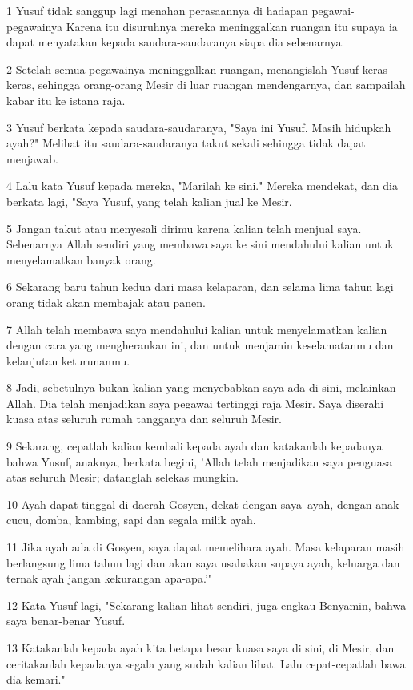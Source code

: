 \par 1 Yusuf tidak sanggup lagi menahan perasaannya di hadapan pegawai-pegawainya Karena itu disuruhnya mereka meninggalkan ruangan itu supaya ia dapat menyatakan kepada saudara-saudaranya siapa dia sebenarnya.
\par 2 Setelah semua pegawainya meninggalkan ruangan, menangislah Yusuf keras-keras, sehingga orang-orang Mesir di luar ruangan mendengarnya, dan sampailah kabar itu ke istana raja.
\par 3 Yusuf berkata kepada saudara-saudaranya, "Saya ini Yusuf. Masih hidupkah ayah?" Melihat itu saudara-saudaranya takut sekali sehingga tidak dapat menjawab.
\par 4 Lalu kata Yusuf kepada mereka, "Marilah ke sini." Mereka mendekat, dan dia berkata lagi, "Saya Yusuf, yang telah kalian jual ke Mesir.
\par 5 Jangan takut atau menyesali dirimu karena kalian telah menjual saya. Sebenarnya Allah sendiri yang membawa saya ke sini mendahului kalian untuk menyelamatkan banyak orang.
\par 6 Sekarang baru tahun kedua dari masa kelaparan, dan selama lima tahun lagi orang tidak akan membajak atau panen.
\par 7 Allah telah membawa saya mendahului kalian untuk menyelamatkan kalian dengan cara yang mengherankan ini, dan untuk menjamin keselamatanmu dan kelanjutan keturunanmu.
\par 8 Jadi, sebetulnya bukan kalian yang menyebabkan saya ada di sini, melainkan Allah. Dia telah menjadikan saya pegawai tertinggi raja Mesir. Saya diserahi kuasa atas seluruh rumah tangganya dan seluruh Mesir.
\par 9 Sekarang, cepatlah kalian kembali kepada ayah dan katakanlah kepadanya bahwa Yusuf, anaknya, berkata begini, 'Allah telah menjadikan saya penguasa atas seluruh Mesir; datanglah selekas mungkin.
\par 10 Ayah dapat tinggal di daerah Gosyen, dekat dengan saya--ayah, dengan anak cucu, domba, kambing, sapi dan segala milik ayah.
\par 11 Jika ayah ada di Gosyen, saya dapat memelihara ayah. Masa kelaparan masih berlangsung lima tahun lagi dan akan saya usahakan supaya ayah, keluarga dan ternak ayah jangan kekurangan apa-apa.'"
\par 12 Kata Yusuf lagi, "Sekarang kalian lihat sendiri, juga engkau Benyamin, bahwa saya benar-benar Yusuf.
\par 13 Katakanlah kepada ayah kita betapa besar kuasa saya di sini, di Mesir, dan ceritakanlah kepadanya segala yang sudah kalian lihat. Lalu cepat-cepatlah bawa dia kemari."
